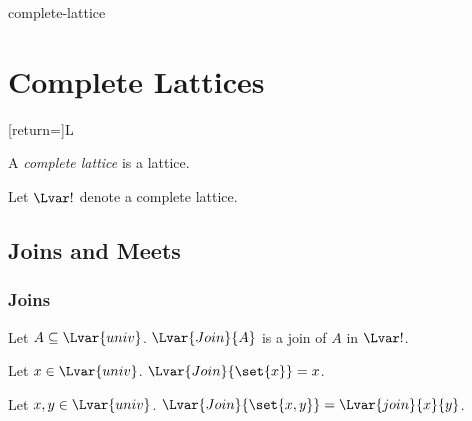 \documentclass{stex}
\begin{document}
\begin{smodule}{complete-lattice}


  \section{Complete Lattices}
  [return=\complattice]{\mathcal L}

  \begin{forthel}
  \end{forthel}
  
  \begin{forthel}
    \begin{signature}
      A \emph{complete lattice} is a lattice.
    \end{signature}

    Let $\Lvar!$ denote a complete lattice.
  \end{forthel}
  
  \subsection{Joins and Meets}

  \subsubsection{Joins}
  
  \begin{forthel}
    \begin{signature}
      Let $A\subseteq\Lvar{univ}$.
      $\Lvar{Join}{A}$ is a join of $A$ in $\Lvar!$.
    \end{signature}
    
    \begin{proposition}
      Let $x\in\Lvar{univ}$.
      $\Lvar{Join}{\set{x}}=x$.
    \end{proposition}
    
    \begin{proposition}
      Let $x,y\in\Lvar{univ}$.
      $\Lvar{Join}{\set{x,y}}=\Lvar{join}{x}{y}$.
    \end{proposition}
  \end{forthel}


\end{smodule}
\end{document}
